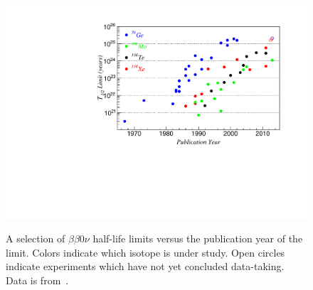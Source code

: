 \begin{figure}
\begin{center}
\includegraphics[keepaspectratio=true,width=\textwidth]{halflife_vs_year.pdf}
\end{center}
\renewcommand{\baselinestretch}{1}
\small\normalsize
\begin{quote}
\caption{A selection of $\beta\beta 0\nu$ half-life limits versus the publication year of the limit.  Colors indicate which isotope is under study.  Open circles indicate experiments which have not yet concluded data-taking.  Data is from~\cite{
PhysRevC.85.045504,PhysRevLett.110.062502,bb0nSearch2012,PhysRevLett.111.122503,
KlapdorDissent,PhysRevLett.83.41,PhysRevC.59.2108,PhysRevD.65.092007,Andreotti2011822,PhysRevC.78.035502,
PhysRevLett.95.142501,Arnaboldi2004260,Baudis1997219,PhysRevLett.95.182302,NEMO2004,NEMO3-2013-100Mo,
doi:10.1142/S0217732390001475,Bernabei200223,Balysh1994176,0954-3899-17-S-014,Arnaboldi2003167,
1112.0859,Baksan2006Gavriljuk,Luescher1998407,Alessandrello1992176,Alessandrello1994519,Alessandrello1998156,
Alessandrello200013,PhysRevD.48.1009,PhysRevLett.59.419,Bellotti1991193,Bellotti1989209,BellottiMilano1986,
Bellotti1984450,Bellotti198372,BellottiMilano1982,PhysRevD.45.2548,PhysRevC.63.065501,0305-4616-13-6-012,
Ejiri199685,Ejiri199117,PhysRevC.55.474,PhysRevLett.71.831,PhysRevLett.63.1671,Fisher1989257,
PhysRevLett.50.721,PhysRevC.34.666,PhysRevLett.53.141,PhysRevD.51.2090,Forster1984301,PhysRevC.56.2451,
Barabash1989273,Fiorini1967602,Fiorini1973,Barabanov:1986iz,Vasilev:1990gi,PhysRevC.38.895}.}
\label{fig:Halflife_vs_year}
\end{quote}
\end{figure}
\renewcommand{\baselinestretch}{2}
\small\normalsize

